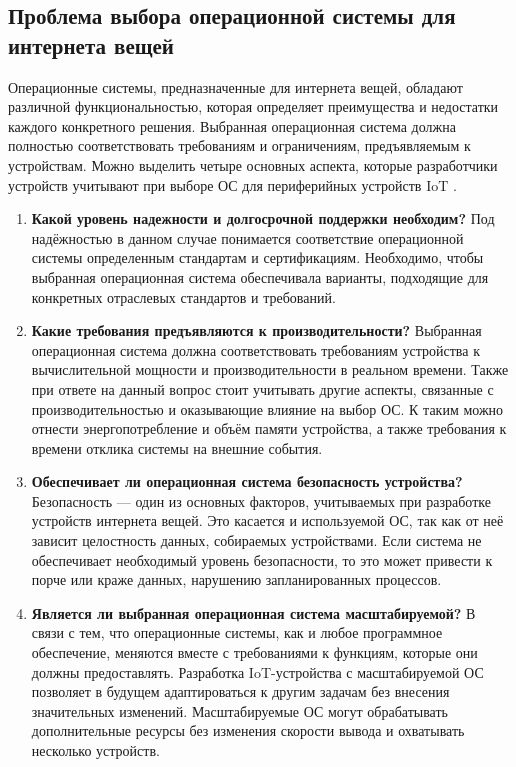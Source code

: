 \subsection{Проблема выбора операционной системы для интернета вещей}

Операционные системы, предназначенные для интернета вещей, обладают различной функциональностью, которая определяет преимущества и недостатки каждого конкретного решения. Выбранная операционная система должна полностью соответствовать требованиям и ограничениям, предъявляемым к устройствам. Можно выделить четыре основных аспекта, которые разработчики устройств учитывают при выборе ОС для периферийных устройств IoT \cite{OS_questions}.



\begin{enumerate}[label*=\arabic*.]
	\item \textbf{Какой уровень надежности и долгосрочной поддержки необходим?} \newline 
	Под надёжностью в данном случае понимается соответствие операционной системы определенным стандартам и сертификациям. Необходимо, чтобы выбранная операционная система обеспечивала варианты, подходящие для конкретных отраслевых стандартов и требований.
	
	\item \textbf{Какие требования предъявляются к производительности?} \newline 
	Выбранная операционная система должна соответствовать требованиям устройства к вычислительной мощности и производительности в реальном времени. Также при ответе на данный вопрос стоит учитывать другие аспекты, связанные с производительностью и оказывающие влияние на выбор ОС. К таким можно отнести энергопотребление и объём памяти устройства, а также требования к времени отклика системы на внешние события.
	
	\item \textbf{Обеспечивает ли операционная система безопасность устройства?} \newline 
	Безопасность --- один из основных факторов, учитываемых при разработке устройств интернета вещей. Это касается и используемой ОС, так как от неё зависит целостность данных, собираемых устройствами. Если система не обеспечивает необходимый уровень безопасности, то это может привести к порче или краже данных, нарушению запланированных процессов.
	
	\item \textbf{Является ли выбранная операционная система масштабируемой?} \newline 
	В связи с тем, что операционные системы, как и любое программное обеспечение, меняются вместе с требованиями к функциям, которые они должны предоставлять. Разработка IoT-устройства с масштабируемой ОС позволяет в будущем адаптироваться к другим задачам без внесения значительных изменений. Масштабируемые ОС могут обрабатывать дополнительные ресурсы без изменения скорости вывода и охватывать несколько устройств. %
	
\end{enumerate}

\pagebreak
